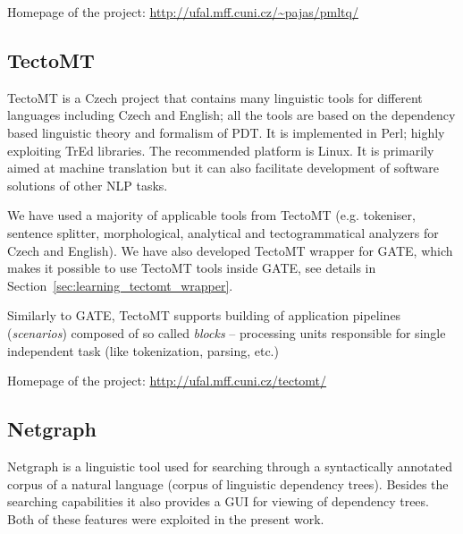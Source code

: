 \medskip
Homepage of the project: \url{http://ufal.mff.cuni.cz/~pajas/pmltq/}



\subsection{TectoMT} \label{sec:third_tectomt}

TectoMT \citep{biblio:ZaPtTectoMTHighly2008} is a Czech project that contains many linguistic tools for different languages including Czech and English; all the tools are based on the dependency based linguistic theory and formalism of PDT. It is implemented in Perl; highly exploiting TrEd libraries. The recommended platform is Linux. %
It is primarily aimed at machine translation but it can also facilitate development of software solutions of other NLP tasks.

We have used a majority of applicable tools from TectoMT (e.g. tokeniser, sentence splitter, morphological, analytical and tectogrammatical analyzers for Czech and English). We have also developed TectoMT wrapper for GATE, which makes it possible to use TectoMT tools inside GATE, see details in Section~\ref{sec:learning_tectomt_wrapper}.

Similarly to GATE, TectoMT supports building of application pipelines (\emph{scenarios}) composed of so called \emph{blocks} -- processing units responsible for single independent task (like tokenization, parsing, etc.)

\medskip
Homepage of the project: \url{http://ufal.mff.cuni.cz/tectomt/}


\subsection{Netgraph} \label{sec:third_netgraph}

Netgraph \citep{biblio:MiNetgraphA2006} is a linguistic tool used for searching through a syntactically annotated corpus of a natural language (corpus of linguistic dependency trees). Besides the searching capabilities it also provides a GUI for viewing of dependency trees. Both of these features were exploited in the present work.

